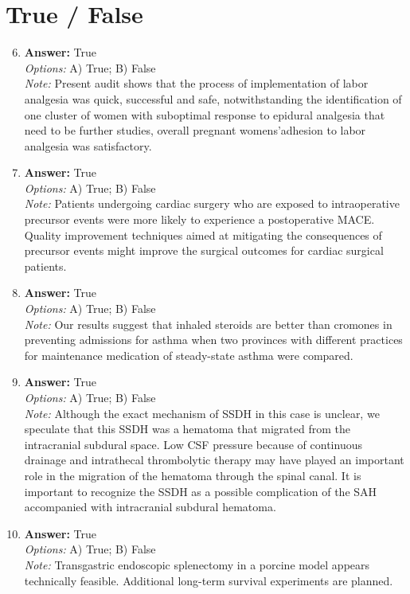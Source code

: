 \documentclass[12pt]{article}
\begin{document}
\section*{True / False}
\begin{enumerate}[label=\arabic*.]
\setcounter{enumi}{5}
\item \textbf{Answer:} True
\\ \textit{Options:} A) True; B) False
\\ \textit{Note:} Present audit shows that the process of implementation of labor analgesia was quick, successful and safe, notwithstanding the identification of one cluster of women with suboptimal response to epidural analgesia that need to be further studies, overall pregnant womens'adhesion to labor analgesia was satisfactory.
\item \textbf{Answer:} True
\\ \textit{Options:} A) True; B) False
\\ \textit{Note:} Patients undergoing cardiac surgery who are exposed to intraoperative precursor events were more likely to experience a postoperative MACE. Quality improvement techniques aimed at mitigating the consequences of precursor events might improve the surgical outcomes for cardiac surgical patients.
\item \textbf{Answer:} True
\\ \textit{Options:} A) True; B) False
\\ \textit{Note:} Our results suggest that inhaled steroids are better than cromones in preventing admissions for asthma when two provinces with different practices for maintenance medication of steady-state asthma were compared.
\item \textbf{Answer:} True
\\ \textit{Options:} A) True; B) False
\\ \textit{Note:} Although the exact mechanism of SSDH in this case is unclear, we speculate that this SSDH was a hematoma that migrated from the intracranial subdural space. Low CSF pressure because of continuous drainage and intrathecal thrombolytic therapy may have played an important role in the migration of the hematoma through the spinal canal. It is important to recognize the SSDH as a possible complication of the SAH accompanied with intracranial subdural hematoma.
\item \textbf{Answer:} True
\\ \textit{Options:} A) True; B) False
\\ \textit{Note:} Transgastric endoscopic splenectomy in a porcine model appears technically feasible. Additional long-term survival experiments are planned.
\end{enumerate}
\end{document}
